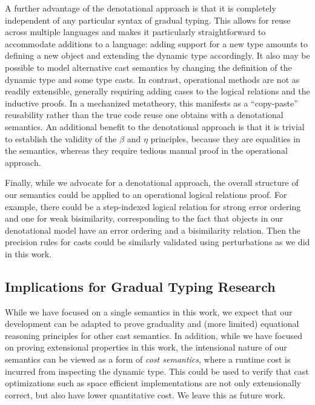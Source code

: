 A further advantage of the denotational approach is that it is completely
independent of any particular syntax of gradual typing. This allows for reuse
across multiple languages and makes it particularly straightforward to
accommodate additions to a language: adding support for a new type amounts to
defining a new object and extending the dynamic type accordingly. It also may be
possible to model alternative cast semantics by changing the definition of the
dynamic type and some type casts.
%
In contrast, operational methods are not as readily extensible, generally
requiring adding cases to the logical relations and the inductive proofs. In a
mechanized metatheory, this manifests as a ``copy-paste'' reusability rather than
the true code reuse one obtains with a denotational semantics.
%
An additional benefit to the denotational approach is that it is trivial to
establish the validity of the $\beta$ and $\eta$ principles, because they are
equalities in the semantics, whereas they require tedious manual proof in the
operational approach.

Finally, while we advocate for a denotational approach, the overall structure of
our semantics could be applied to an operational logical relations proof. For
example, there could be a step-indexed logical relation for strong error
ordering and one for weak bisimilarity, corresponding to the fact that objects
in our denotational model have an error ordering and a bisimilarity relation.
Then the precision rules for casts could be similarly validated using
perturbations as we did in this work.

\subsection{Implications for Gradual Typing Research}

While we have focused on a single semantics in this work, we expect that our
development can be adapted to prove graduality and (more limited) equational
reasoning principles for other cast semantics.
%
In addition, while we have focused on proving extensional properties in this
work, the intensional nature of our semantics can be viewed as a form of
\emph{cost semantics}, where a runtime cost is incurred from inspecting the
dynamic type. This could be used to verify that cast optimizations such as space
efficient implementations \cite{herman-tomb-flanagan-2010} are not only
extensionally correct, but also have lower quantitative cost. We leave this as
future work.

